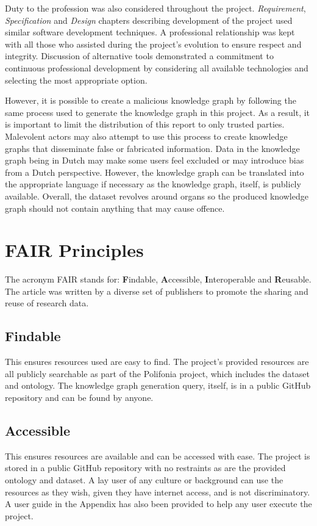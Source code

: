 Duty to the profession was also considered throughout the project. \textit{Requirement}, \textit{Specification} and \textit{Design} chapters describing development of the project used similar software development techniques. A professional relationship was kept with all those who assisted during the project's evolution to ensure respect and integrity. Discussion of alternative tools demonstrated a commitment to continuous professional development by considering all available technologies and selecting the most appropriate option.

However, it is possible to create a malicious knowledge graph by following the same process used to generate the knowledge graph in this project. As a result, it is important to limit the distribution of this report to only trusted parties. Malevolent actors may also attempt to use this process to create knowledge graphs that disseminate false or fabricated information. Data in the knowledge graph being in Dutch may make some users feel excluded or may introduce bias from a Dutch perspective. However, the knowledge graph can be translated into the appropriate language if necessary as the knowledge graph, itself, is publicly available. Overall, the dataset revolves around organs so the produced knowledge graph should not contain anything that may cause offence.

\section{FAIR Principles}
\hspace{0.5cm} The acronym FAIR stands for: \textbf{F}indable, \textbf{A}ccessible, \textbf{I}nteroperable and \textbf{R}eusable. The article \cite{fairprinciples} was written by a diverse set of publishers to promote the sharing and reuse of research data. 

\subsection{Findable}
\hspace{0.5cm} This ensures resources used are easy to find. The project's provided resources are all publicly searchable as part of the Polifonia project, which includes the dataset and ontology. The knowledge graph generation query, itself, is in a public GitHub repository and can be found by anyone. 

\subsection{Accessible}
\hspace{0.5cm} This ensures resources are available and can be accessed with ease. The project is stored in a public GitHub repository with no restraints as are the provided ontology and dataset. A lay user of any culture or background can use the resources as they wish, given they have internet access, and is not discriminatory. A user guide in the Appendix has also been provided to help any user execute the project. 

